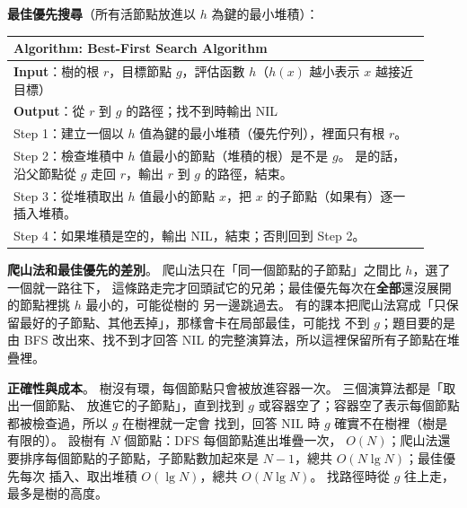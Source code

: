 \begin{pastsoln}
\textbf{最佳優先搜尋}（所有活節點放進以 $h$ 為鍵的最小堆積）：
\begin{center}
\small
\begin{tabular}{|p{0.92\linewidth}|}
\hline
\textbf{Algorithm:} Best-First Search Algorithm\\ \hline
\textbf{Input}：樹的根 $r$，目標節點 $g$，評估函數 $h$（$h(x)$ 越小表示 $x$ 越接近目標）\\
\textbf{Output}：從 $r$ 到 $g$ 的路徑；找不到時輸出 NIL\\ \hline
Step 1：建立一個以 $h$ 值為鍵的最小堆積（優先佇列），裡面只有根 $r$。\\
Step 2：檢查堆積中 $h$ 值最小的節點（堆積的根）是不是 $g$。 是的話，沿父節點從 $g$ 走回 $r$，輸出 $r$ 到 $g$ 的路徑，結束。\\
Step 3：從堆積取出 $h$ 值最小的節點 $x$，把 $x$ 的子節點（如果有）逐一插入堆積。\\
Step 4：如果堆積是空的，輸出 NIL，結束；否則回到 Step 2。\\ \hline
\end{tabular}
\end{center}

\textbf{爬山法和最佳優先的差別}。 爬山法只在「同一個節點的子節點」之間比 $h$，選了一個就一路往下，
這條路走完才回頭試它的兄弟；最佳優先每次在\textbf{全部}還沒展開的節點裡挑 $h$ 最小的，可能從樹的
另一邊跳過去。 有的課本把爬山法寫成「只保留最好的子節點、其他丟掉」，那樣會卡在局部最佳，可能找
不到 $g$；題目要的是由 BFS 改出來、找不到才回答 NIL 的完整演算法，所以這裡保留所有子節點在堆疊裡。

\textbf{正確性與成本}。 樹沒有環，每個節點只會被放進容器一次。 三個演算法都是「取出一個節點、
放進它的子節點」，直到找到 $g$ 或容器空了；容器空了表示每個節點都被檢查過，所以 $g$ 在樹裡就一定會
找到，回答 NIL 時 $g$ 確實不在樹裡（樹是有限的）。 設樹有 $N$ 個節點：DFS 每個節點進出堆疊一次，
$O(N)$；爬山法還要排序每個節點的子節點，子節點數加起來是 $N - 1$，總共 $O(N \lg N)$；最佳優先每次
插入、取出堆積 $O(\lg N)$，總共 $O(N \lg N)$。 找路徑時從 $g$ 往上走，最多是樹的高度。
\end{pastsoln}
